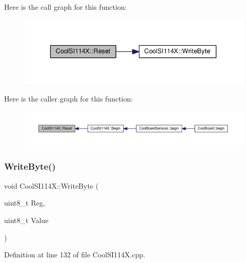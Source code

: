 Here is the call graph for this function\+:\nopagebreak
\begin{figure}[H]
\begin{center}
\leavevmode
\includegraphics[width=336pt]{class_cool_s_i114_x_a9d9f9c9129c0c29ed497f8563f3dd823_cgraph}
\end{center}
\end{figure}
Here is the caller graph for this function\+:\nopagebreak
\begin{figure}[H]
\begin{center}
\leavevmode
\includegraphics[width=350pt]{class_cool_s_i114_x_a9d9f9c9129c0c29ed497f8563f3dd823_icgraph}
\end{center}
\end{figure}
\mbox{\label{class_cool_s_i114_x_ac5c8dc5ade604da7a1c8cd1586feefc2}} 
\subsubsection{\texorpdfstring{Write\+Byte()}{WriteByte()}}
{\footnotesize\ttfamily void Cool\+S\+I114\+X\+::\+Write\+Byte (\begin{DoxyParamCaption}\item[{uint8\+\_\+t}]{Reg,  }\item[{uint8\+\_\+t}]{Value }\end{DoxyParamCaption})\hspace{0.3cm}{\ttfamily [private]}}



Definition at line 132 of file Cool\+S\+I114\+X.\+cpp.

